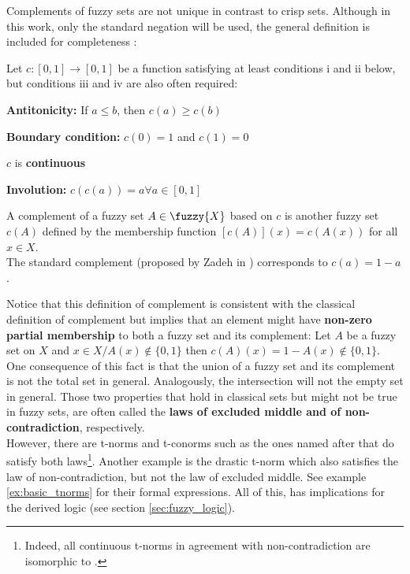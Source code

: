 Complements of fuzzy sets are not unique in contrast to crisp sets. Although in this work, only the standard negation will be used, the general definition is included for completeness \cite[p.~50]{HistoryFL2017}: 

\begin{definition}[Complement]
Let $c : [0,1] \rightarrow [0,1]$ be a function satisfying at least conditions i and ii below, but conditions iii and iv are also often required:
  \begin{romanenum}
    \item \textbf{Antitonicity:} If $a \leq b$, then $c(a) \geq c(b)$
    \item \textbf{Boundary condition:} $c(0) = 1$ and $c(1) = 0$ 
    \item $c$ is \textbf{continuous}
    \item \textbf{Involution:} $c(c(a)) = a \forall a \in [0,1]$
  \end{romanenum}
  A complement of a fuzzy set $A \in \fuzzy{X}$ based on $c$ is another fuzzy set $c(A)$ defined by the membership function $[c(A)](x) = c(A(x))$ for all $x \in X$.\\

  The standard complement (proposed by Zadeh in \cite{Zadeh1965}) corresponds to $c(a) = 1 - a$.
\end{definition}


Notice that this definition of complement is consistent with the classical definition of complement but implies that an element might have \textbf{non-zero partial membership} to both a fuzzy set and its complement: Let $A$ be a fuzzy set on $X$ and $x \in X / A(x)\notin \{0,1\}$ then $c( A)(x)= 1 - A(x) \notin \{0,1\}$.\\

One consequence of this fact is that the union of a fuzzy set and its complement is not the total set in general. Analogously, the intersection will not the empty set in general. Those two properties that hold in classical sets but might not be true in fuzzy sets, are often called the \textbf{laws of excluded middle and of non-contradiction}, respectively.\\

However, there are t-norms and t-conorms such as the ones named after \luka that do satisfy both laws\footnote{Indeed, all continuous t-norms in agreement with non-contradiction are isomorphic to \luka \cite[p.~7]{LukasiewiczNonContrad}.}. Another example is the drastic t-norm which also satisfies the law of non-contradiction, but not the law of excluded middle. See example \ref{ex:basic_tnorms} for their formal expressions. All of this, has implications for the derived logic (see section \ref{sec:fuzzy_logic}).\\

